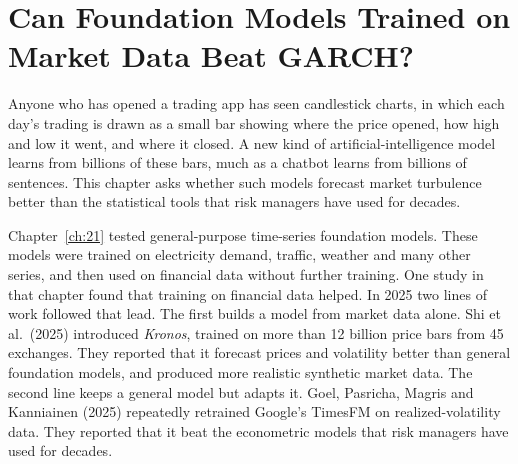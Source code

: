 \makeatletter
{}
\makeatother

\makeatletter
\makeatother

\chapter{Can Foundation Models Trained on Market Data Beat GARCH?}
\label{ch:23}
\providecommand{\term}[1]{\emph{#1}}

Anyone who has opened a trading app has seen candlestick charts, in which each day's trading is drawn as a small bar showing where the price opened, how high and low it went, and where it closed. A new kind of artificial-intelligence model learns from billions of these bars, much as a chatbot learns from billions of sentences. This chapter asks whether such models forecast market turbulence better than the statistical tools that risk managers have used for decades.

Chapter~\ref{ch:21} tested general-purpose time-series foundation models. These models were trained on electricity demand, traffic, weather and many other series, and then used on financial data without further training. One study in that chapter found that training on financial data helped. In 2025 two lines of work followed that lead. The first builds a model from market data alone. Shi et al.\ (2025) introduced \term{Kronos}, trained on more than 12 billion price bars from 45 exchanges. They reported that it forecast prices and volatility better than general foundation models, and produced more realistic synthetic market data. The second line keeps a general model but adapts it. Goel, Pasricha, Magris and Kanniainen (2025) repeatedly retrained Google's TimesFM on realized-volatility data. They reported that it beat the econometric models that risk managers have used for decades.

